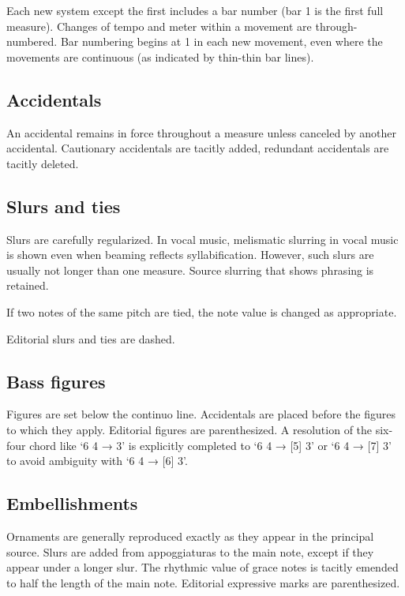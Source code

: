 \documentclass[abbrwidth=7em,shorttitlesize=55]{ees}
\begin{document}
Each new system except the first includes a bar number (bar 1 is the first full measure). Changes of tempo and meter within a movement are through-numbered. Bar numbering begins at 1 in each new movement, even where the movements are continuous (as indicated by thin-thin bar lines).


\subsection{Accidentals}

An accidental remains in force throughout a measure unless canceled by another accidental. Cautionary accidentals are tacitly added, redundant accidentals are tacitly deleted.


\subsection{Slurs and ties}

Slurs are carefully regularized. In vocal music, melismatic slurring in vocal music is shown even when beaming reflects syllabification. However, such slurs are usually not longer than one measure. Source slurring that shows phrasing is retained.

If two notes of the same pitch are tied, the note value is changed as appropriate.

Editorial slurs and ties are dashed.


\subsection{Bass figures}

Figures are set below the continuo line. Accidentals are placed before the figures to which they apply. Editorial figures are parenthesized. A resolution of the six-four chord like ‘6 4 → 3’ is explicitly completed to ‘6 4 → [5] 3’ or ‘6 4 → [7] 3’ to avoid ambiguity with ‘6 4 → [6] 3’.


\subsection{Embellishments}

Ornaments are generally reproduced exactly as they appear in the principal source. Slurs are added from appoggiaturas to the main note, except if they appear under a longer slur. The rhythmic value of grace notes is tacitly emended to half the length of the main note. Editorial expressive marks are parenthesized.
\end{document}
